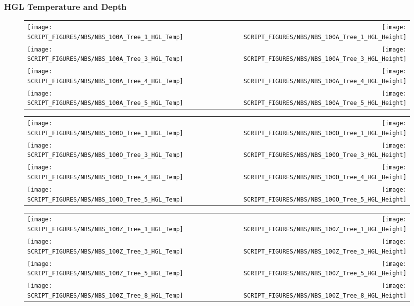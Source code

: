 \subsubsection{HGL Temperature and Depth}

\begin{figure}[!ht]
\begin{tabular*}{\textwidth}{l@{\extracolsep{\fill}}r}
\texttt{[image: SCRIPT\_FIGURES/NBS/NBS\_100A\_Tree\_1\_HGL\_Temp]} &
\texttt{[image: SCRIPT\_FIGURES/NBS/NBS\_100A\_Tree\_1\_HGL\_Height]} \\
\texttt{[image: SCRIPT\_FIGURES/NBS/NBS\_100A\_Tree\_3\_HGL\_Temp]} &
\texttt{[image: SCRIPT\_FIGURES/NBS/NBS\_100A\_Tree\_3\_HGL\_Height]} \\
\texttt{[image: SCRIPT\_FIGURES/NBS/NBS\_100A\_Tree\_4\_HGL\_Temp]} &
\texttt{[image: SCRIPT\_FIGURES/NBS/NBS\_100A\_Tree\_4\_HGL\_Height]} \\
\texttt{[image: SCRIPT\_FIGURES/NBS/NBS\_100A\_Tree\_5\_HGL\_Temp]} &
\texttt{[image: SCRIPT\_FIGURES/NBS/NBS\_100A\_Tree\_5\_HGL\_Height]}
\end{tabular*}
\end{figure}

\begin{figure}[!ht]
\begin{tabular*}{\textwidth}{l@{\extracolsep{\fill}}r}
\texttt{[image: SCRIPT\_FIGURES/NBS/NBS\_100O\_Tree\_1\_HGL\_Temp]} &
\texttt{[image: SCRIPT\_FIGURES/NBS/NBS\_100O\_Tree\_1\_HGL\_Height]} \\
\texttt{[image: SCRIPT\_FIGURES/NBS/NBS\_100O\_Tree\_3\_HGL\_Temp]} &
\texttt{[image: SCRIPT\_FIGURES/NBS/NBS\_100O\_Tree\_3\_HGL\_Height]} \\
\texttt{[image: SCRIPT\_FIGURES/NBS/NBS\_100O\_Tree\_4\_HGL\_Temp]} &
\texttt{[image: SCRIPT\_FIGURES/NBS/NBS\_100O\_Tree\_4\_HGL\_Height]} \\
\texttt{[image: SCRIPT\_FIGURES/NBS/NBS\_100O\_Tree\_5\_HGL\_Temp]} &
\texttt{[image: SCRIPT\_FIGURES/NBS/NBS\_100O\_Tree\_5\_HGL\_Height]}
\end{tabular*}
\end{figure}

\begin{figure}[!ht]
\begin{tabular*}{\textwidth}{l@{\extracolsep{\fill}}r}
\texttt{[image: SCRIPT\_FIGURES/NBS/NBS\_100Z\_Tree\_1\_HGL\_Temp]} &
\texttt{[image: SCRIPT\_FIGURES/NBS/NBS\_100Z\_Tree\_1\_HGL\_Height]} \\
\texttt{[image: SCRIPT\_FIGURES/NBS/NBS\_100Z\_Tree\_3\_HGL\_Temp]} &
\texttt{[image: SCRIPT\_FIGURES/NBS/NBS\_100Z\_Tree\_3\_HGL\_Height]} \\
\texttt{[image: SCRIPT\_FIGURES/NBS/NBS\_100Z\_Tree\_5\_HGL\_Temp]} &
\texttt{[image: SCRIPT\_FIGURES/NBS/NBS\_100Z\_Tree\_5\_HGL\_Height]} \\
\texttt{[image: SCRIPT\_FIGURES/NBS/NBS\_100Z\_Tree\_8\_HGL\_Temp]} &
\texttt{[image: SCRIPT\_FIGURES/NBS/NBS\_100Z\_Tree\_8\_HGL\_Height]}
\end{tabular*}
\end{figure}

